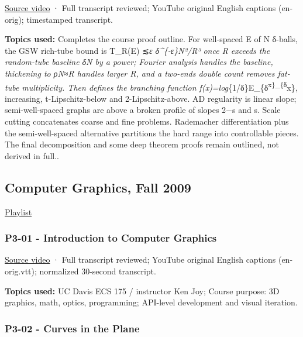 \href{https://www.youtube.com/watch?v=h0Ln82BR4R0}{Source video} · Full transcript reviewed; YouTube original English captions (en-orig); timestamped transcript.

\textbf{Topics used:} Completes the course proof outline. For well-spaced E of N δ-balls, the GSW rich-tube bound is \textbar T\_R(E)\textbar{} ≲\emph{ε δ\^{}\{-ε\}N²/R³ once R exceeds the random-tube baseline δN by a power; Fourier analysis handles the baseline, thickening to ρN≈R handles larger R, and a two-ends double count removes fat-tube multiplicity. Then defines the branching function f(x)=log}\{1/δ\}\textbar E\_\{δ\textsuperscript{x\}\textbar\_\{δ}x\}, increasing, t-Lipschitz-below and 2-Lipschitz-above. AD regularity is linear slope; semi-well-spaced graphs are above a broken profile of slopes 2−s and s. Scale cutting concatenates coarse and fine problems. Rademacher differentiation plus the semi-well-spaced alternative partitions the hard range into controllable pieces. The final decomposition and some deep theorem proofs remain outlined, not derived in full..

\subsection{Computer Graphics, Fall 2009}\label{04-visual-computing-ii-ch036-computer-graphics-fall-2009}

\href{https://www.youtube.com/playlist?list=PL_w_qWAQZtAZhtzPI5pkAtcUVgmzdAP8g}{Playlist}

\subsubsection{P3-01 - Introduction to Computer Graphics}\label{04-visual-computing-ii-ch036-p3-01---introduction-to-computer-graphics}

\href{https://www.youtube.com/watch?v=01YSK5gIEYQ}{Source video} · Full transcript reviewed; YouTube original English captions (en-orig.vtt); normalized 30-second transcript.

\textbf{Topics used:} UC Davis ECS 175 / instructor Ken Joy; Course purpose: 3D graphics, math, optics, programming; API-level development and visual iteration.

\subsubsection{P3-02 - Curves in the Plane}\label{04-visual-computing-ii-ch036-p3-02---curves-in-the-plane}

